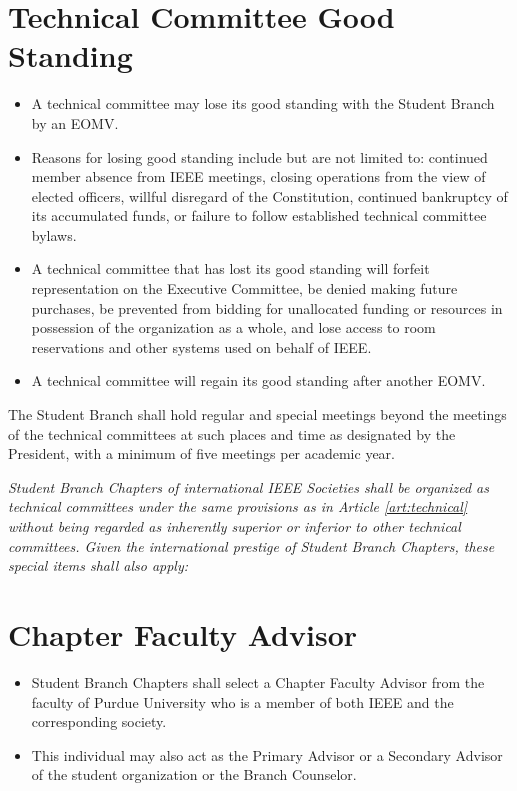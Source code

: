 \documentclass[12pt]{constitution}
\begin{document}
\section{Technical Committee Good Standing}
\label{sec:tech_goodstand}
\begin{itemize}
    \item A technical committee may lose its good standing with the Student Branch by an EOMV.
    \item Reasons for losing good standing include but are not limited to: continued member absence from IEEE meetings, closing operations from the view of elected officers, willful disregard of the Constitution, continued bankruptcy of its accumulated funds, or failure to follow established technical committee bylaws.
    \item A technical committee that has lost its good standing will forfeit representation on the Executive Committee, be denied making future purchases, be prevented from bidding for unallocated funding or resources in possession of the organization as a whole, and lose access to room reservations and other systems used on behalf of IEEE.
    \item A technical committee will regain its good standing after another EOMV.
\end{itemize}


\label{art:meet}

The Student Branch shall hold regular and special meetings beyond the meetings of the technical committees at such places and time as designated by the President, with a minimum of five meetings per academic year.


\label{art:sbc}

\textit{Student Branch Chapters of international IEEE Societies shall be organized as technical committees under the same provisions as in Article \ref{art:technical} without being regarded as inherently superior or inferior to other technical committees. Given the international prestige of Student Branch Chapters, these special items shall also apply:}

\section{Chapter Faculty Advisor}
\label{sec:sbc_cfa}
\begin{itemize}
    \item Student Branch Chapters shall select a Chapter Faculty Advisor from the faculty of Purdue University who is a member of both IEEE and the corresponding society.
    \item This individual may also act as the Primary Advisor or a Secondary Advisor of the student organization or the Branch Counselor.
\end{itemize}
\end{document}
